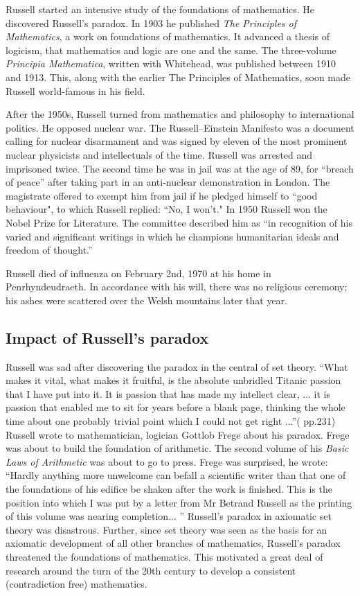 \documentclass{article}
\begin{document}
Russell started an intensive study of the foundations of mathematics. He discovered Russell's paradox. In 1903 he published {\em The Principles of Mathematics}, a work on foundations of mathematics. It advanced a thesis of logicism, that mathematics and logic are one and the same. The three-volume {\em Principia Mathematica}, written with Whitehead, was published between 1910 and 1913. This, along with the earlier The Principles of Mathematics, soon made Russell world-famous in his field.

After the 1950s, Russell turned from mathematics and philosophy to international politics. He opposed nuclear war. The Russell–Einstein Manifesto was a document calling for nuclear disarmament and was signed by eleven of the most prominent nuclear physicists and intellectuals of the time. Russell was arrested and imprisoned twice. The second time he was in jail was at the age of 89, for ``breach of peace'' after taking part in an anti-nuclear demonstration in London. The magistrate offered to exempt him from jail if he pledged himself to ``good behaviour", to which Russell replied: ``No, I won't." In 1950 Russell won the Nobel Prize for Literature. The committee described him as ``in recognition of his varied and significant writings in which he champions humanitarian ideals and freedom of thought.''

Russell died of influenza on February 2nd, 1970 at his home in Penrhyndeudraeth. In accordance with his will, there was no religious ceremony; his ashes were scattered over the Welsh mountains later that year.

\subsection{Impact of Russell's paradox}

Russell was sad after discovering the paradox in the central of set theory. ``What makes it vital, what makes it fruitful, is the absolute unbridled Titanic passion that I have put into it. It is passion that has made my intellect clear, ... it is passion that enabled me to sit for years before a blank page, thinking the whole time about one probably trivial point which I could not get right ...''(\cite{HanXueTao16} pp.231) Russell wrote to mathematician, logician Gottlob Frege about his paradox. Frege was about to build the foundation of arithmetic. The second volume of his {\em Basic Laws of Arithmetic} was about to go to press. Frege was surprised, he wrote: ``Hardly anything more unwelcome can befall a scientific writer than that one of the foundations of his edifice be shaken after the work is finished. This is the position into which I was put by a letter from Mr Betrand Russell as the printing of this volume was nearing completion... '' Russell's paradox in axiomatic set theory was disastrous. Further, since set theory was seen as the basis for an axiomatic development of all other branches of mathematics, Russell's paradox threatened the foundations of mathematics. This motivated a great deal of research around the turn of the 20th century to develop a consistent (contradiction free) mathematics.
\end{document}
